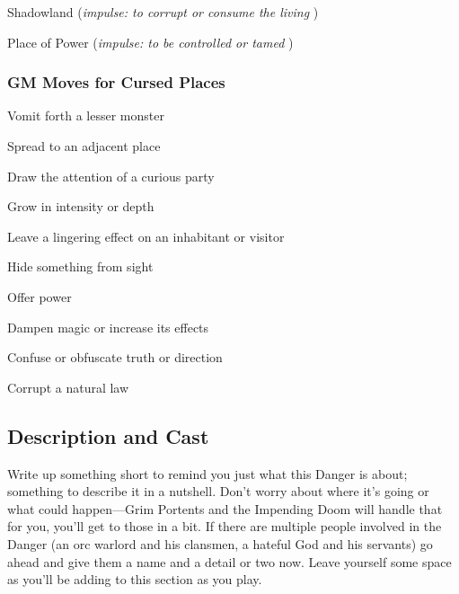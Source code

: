          
\item Shadowland ({\em impulse: to corrupt or consume the living} )

         
\item Place of Power ({\em impulse: to be controlled or tamed} )

       
\stopitemize
       
\subsubsection{GM Moves for Cursed Places}      
       
\startitemize[1,packed]
         
\item Vomit forth a lesser monster

         
\item Spread to an adjacent place

         
\item Draw the attention of a curious party

         
\item Grow in intensity or depth

         
\item Leave a lingering effect on an inhabitant or visitor

         
\item Hide something from sight

         
\item Offer power

         
\item Dampen magic or increase its effects

         
\item Confuse or obfuscate truth or direction

         
\item Corrupt a natural law

       
\stopitemize
       
\subsection{Description and Cast}    
       

Write up something short to remind you just what this Danger is about; something to describe it in a nutshell. Don’t worry about where it’s going or what could happen—Grim Portents and the Impending Doom will handle that for you, you'll get to those in a bit. If there are multiple people involved in the Danger (an orc warlord and his clansmen, a hateful God and his servants) go ahead and give them a name and a detail or two now. Leave yourself some space as you'll be adding to this section as you play.

